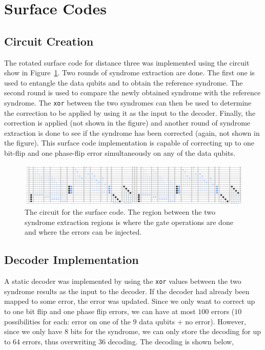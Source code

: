\documentclass[11pt]{article}
\begin{document}
\section{Surface Codes}

\subsection{Circuit Creation}
The rotated surface code for distance three was implemented using the circuit show in Figure~\ref{fig:surface}. Two rounds of syndrome extraction are done. The first one is used to entangle the data qubits and to obtain the reference syndrome. The second round is used to compare the newly obtained syndrome with the reference syndrome. The \texttt{xor} between the two syndromes can then be used to determine the correction to be applied by using it as the input to the decoder. Finally, the correction is applied (not shown in the figure) and another round of syndrome extraction is done to see if the syndrome has been corrected (again, not shown in the figure). This surface code implementation is capable of correcting up to one bit-flip and one phase-flip error simultaneously on any of the data qubits.
\begin{figure}[h!]
    \centering
    \includegraphics[width=\linewidth]{outputs/surface_code.png}
    \caption{The circuit for the surface code. The region between the two syndrome extraction regions is where the gate operations are done and where the errors can be injected.}\label{fig:surface}
\end{figure}

\subsection{Decoder Implementation}
A static decoder was implemented by using the \texttt{xor} values between the two syndrome results as the input to the decoder. If the decoder had already been mapped to some error, the error was updated. Since we only want to correct up to one bit flip and one phase flip errors, we can have at most $100$ errors ($10$ possibilities for each: error on one of the $9$ data qubits + no error). However, since we only have $8$ bits for the syndrome, we can only store the decoding for up to $64$ errors, thus overwriting $36$ decoding. The decoding is shown below,
\inputminted{python}{outputs/surface_code_decoder}
\end{document}
